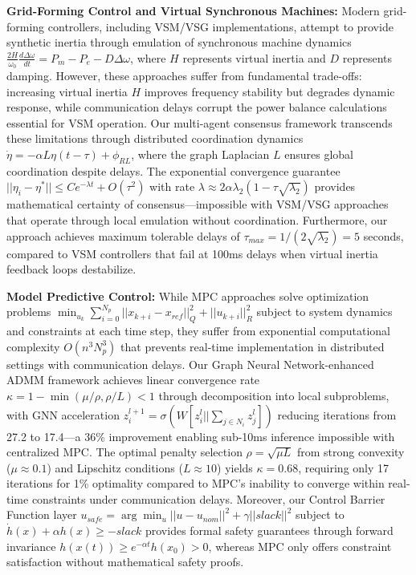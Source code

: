 \documentclass[12pt]{article}
\begin{document}
\textbf{Grid-Forming Control and Virtual Synchronous Machines:} Modern grid-forming controllers, including VSM/VSG implementations, attempt to provide synthetic inertia through emulation of synchronous machine dynamics $\frac{2H}{\omega_0}\frac{d\Delta\omega}{dt} = P_m - P_e - D\Delta\omega$, where $H$ represents virtual inertia and $D$ represents damping. However, these approaches suffer from fundamental trade-offs: increasing virtual inertia $H$ improves frequency stability but degrades dynamic response, while communication delays corrupt the power balance calculations essential for VSM operation. Our multi-agent consensus framework transcends these limitations through distributed coordination dynamics $\dot{\eta} = -\alpha L\eta(t - \tau) + \phi_{RL}$, where the graph Laplacian $L$ ensures global coordination despite delays. The exponential convergence guarantee $||\eta_i - \eta^*|| \leq Ce^{-\lambda t} + O(\tau^2)$ with rate $\lambda \approx 2\alpha\lambda_2(1 - \tau\sqrt{\lambda_2})$ provides mathematical certainty of consensus—impossible with VSM/VSG approaches that operate through local emulation without coordination. Furthermore, our approach achieves maximum tolerable delays of $\tau_{max} = 1/(2\sqrt{\lambda_2}) = 5$ seconds, compared to VSM controllers that fail at 100ms delays when virtual inertia feedback loops destabilize.

\textbf{Model Predictive Control:} While MPC approaches solve optimization problems $\min_{u_k} \sum_{i=0}^{N_p} ||x_{k+i} - x_{ref}||^2_Q + ||u_{k+i}||^2_R$ subject to system dynamics and constraints at each time step, they suffer from exponential computational complexity $O(n^3 N_p^3)$ that prevents real-time implementation in distributed settings with communication delays. Our Graph Neural Network-enhanced ADMM framework achieves linear convergence rate $\kappa = 1 - \min(\mu/\rho, \rho/L) < 1$ through decomposition into local subproblems, with GNN acceleration $z^{l+1}_i = \sigma(W[z^l_i || \sum_{j \in N_i} z^l_j])$ reducing iterations from 27.2 to 17.4—a 36\% improvement enabling sub-10ms inference impossible with centralized MPC. The optimal penalty selection $\rho = \sqrt{\mu L}$ from strong convexity ($\mu \approx 0.1$) and Lipschitz conditions ($L \approx 10$) yields $\kappa = 0.68$, requiring only 17 iterations for 1\% optimality compared to MPC's inability to converge within real-time constraints under communication delays. Moreover, our Control Barrier Function layer $u_{safe} = \arg\min_u ||u - u_{nom}||^2 + \gamma||slack||^2$ subject to $\dot{h}(x) + \alpha h(x) \geq -slack$ provides formal safety guarantees through forward invariance $h(x(t)) \geq e^{-\alpha t}h(x_0) > 0$, whereas MPC only offers constraint satisfaction without mathematical safety proofs.
\end{document}
